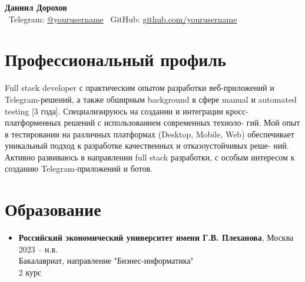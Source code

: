 \documentclass[a4paper,11pt]{article}
\begin{document}
\begin{center}
  {\Huge\textbf{Даниил Дорохов}}\\[0.3cm]
  \faEnvelope\ Telegram: \href{https://t.me/yourusername}{@yourusername} \quad
  \faGithub\ GitHub: \href{https://github.com/yourusername}{github.com/yourusername}
\end{center}

\section{Профессиональный профиль}
Full stack developer с практическим опытом разработки веб-приложений и Telegram-решений,
а также обширным background в сфере manual и automated testing [3 года]. Специализируюсь на
создании и интеграции кросс-платформенных решений с использованием современных техноло-
гий. Мой опыт в тестировании на различных платформах (Desktop, Mobile,
Web) обеспечивает уникальный подход к разработке качественных и отказоустойчивых реше-
ний. Активно развиваюсь в направлении full stack разработки, с особым интересом к созданию
Telegram-приложений и ботов.

\section{Образование}
\begin{itemize}[leftmargin=*]
  \item \textbf{Российский экономический университет имени Г.В. Плеханова}, Москва \hfill 2023 -- н.в.\\
  Бакалавриат, направление "Бизнес-информатика"\\
  2 курс

\end{itemize}

\end{document}
